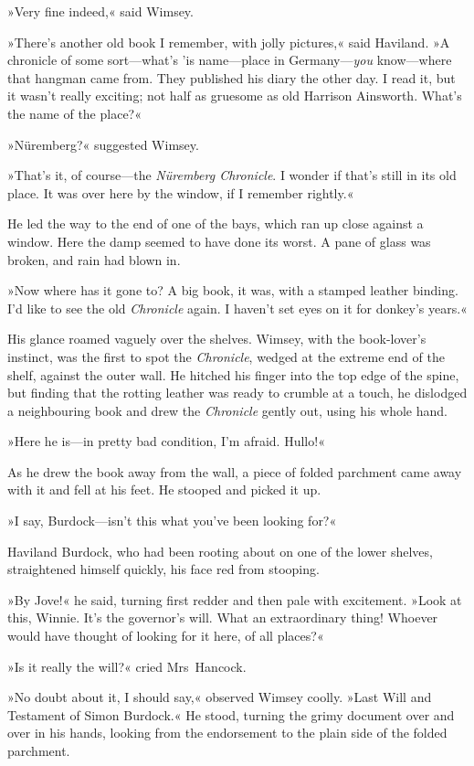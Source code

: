 »Very fine indeed,« said Wimsey.

»There's another old book I remember, with jolly pictures,« said Haviland. »A chronicle of some sort—what's 'is name—place in Germany—\textit{you} know—where that hangman came from. They published his diary the other day. I read it, but it wasn't really exciting; not half as gruesome as old Harrison Ainsworth. What's the name of the place?«

»Nüremberg?« suggested Wimsey.

»That's it, of course—the \textit{Nüremberg \textit{Chronicle}}. I wonder if that's still in its old place. It was over here by the window, if I remember rightly.«

He led the way to the end of one of the bays, which ran up close against a window. Here the damp seemed to have done its worst. A pane of glass was broken, and rain had blown in.

»Now where has it gone to? A big book, it was, with a stamped leather binding. I'd like to see the old \textit{\textit{Chronicle}} again. I haven't set eyes on it for donkey's years.«

His glance roamed vaguely over the shelves. Wimsey, with the book-lover's instinct, was the first to spot the \textit{\textit{Chronicle}}, wedged at the extreme end of the shelf, against the outer wall. He hitched his finger into the top edge of the spine, but finding that the rotting leather was ready to crumble at a touch, he dislodged a neighbouring book and drew the \textit{\textit{Chronicle}} gently out, using his whole hand.

»Here he is—in pretty bad condition, I'm afraid. Hullo!«

As he drew the book away from the wall, a piece of folded parchment came away with it and fell at his feet. He stooped and picked it up.

»I say, Burdock—isn't this what you've been looking for?«

Haviland Burdock, who had been rooting about on one of the lower shelves, straightened himself quickly, his face red from stooping.

»By Jove!« he said, turning first redder and then pale with excitement. »Look at this, Winnie. It's the governor's will. What an extraordinary thing! Whoever would have thought of looking for it here, of all places?«

»Is it really the will?« cried Mrs~Hancock.

»No doubt about it, I should say,« observed Wimsey coolly. »Last Will and Testament of Simon Burdock.« He stood, turning the grimy document over and over in his hands, looking from the endorsement to the plain side of the folded parchment.


